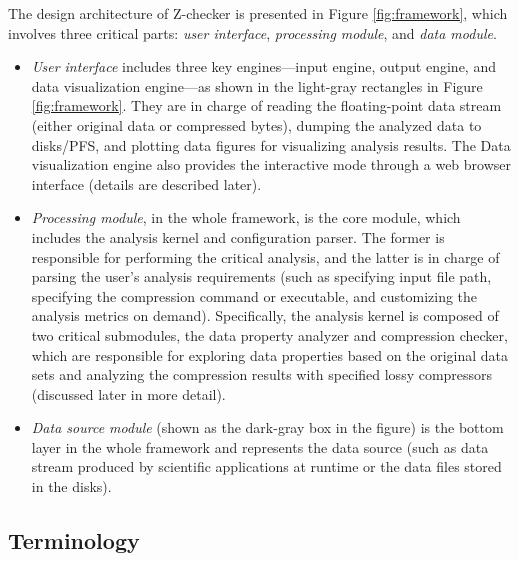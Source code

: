 The design architecture of Z-checker is presented in Figure \ref{fig:framework}, which involves three critical parts: \emph{user interface},  \emph{processing module}, and \emph{data module}.
\begin{itemize}
\item \emph{User interface} includes three key engines---input engine, output engine, and data visualization engine---as shown in the light-gray rectangles in Figure \ref{fig:framework}. They are in charge of reading the floating-point data stream (either original data or compressed bytes), dumping the analyzed data to disks/PFS, and plotting data figures for visualizing analysis results. The Data visualization engine also provides the interactive mode through a web browser interface (details are described later).
\item \emph{Processing module}, in the whole framework, is the core module, which includes the analysis kernel and configuration parser. The former is responsible for performing the critical analysis, and the latter is in charge of parsing the user's analysis requirements (such as specifying input file path, specifying the compression command or executable, and customizing the analysis metrics on demand). Specifically, the analysis kernel is composed of two critical submodules, the data property analyzer and compression checker, which are responsible for exploring data properties based on the original data sets and analyzing the compression results with specified lossy compressors (discussed later in more detail).
\item \emph{Data source module} (shown as the dark-gray box in the figure) is the bottom layer in the whole framework and represents the data source (such as data stream produced by scientific applications at runtime or the data files stored in the disks).
\end{itemize}

\subsection{Terminology}

